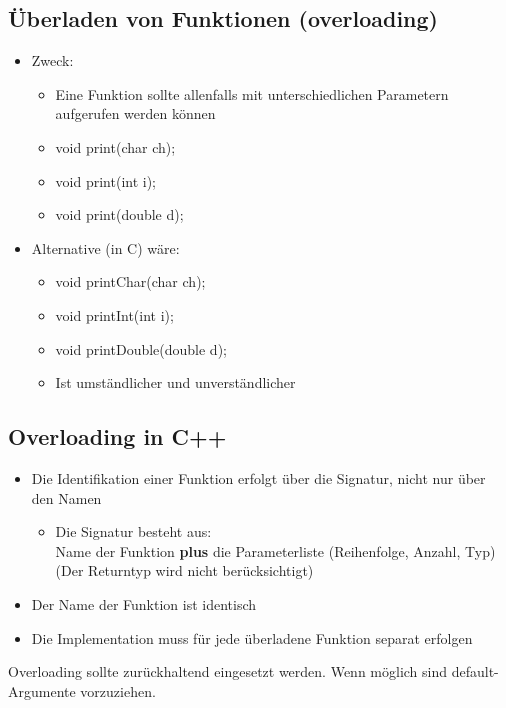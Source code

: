 \subsection{Überladen von Funktionen (overloading)}
\label{sec:Ueberladen von Funktionen (overloading)}
\begin{itemize}
	\item Zweck:
	\begin{itemize}
		\item[\-] Eine Funktion sollte allenfalls mit unterschiedlichen Parametern aufgerufen werden können\\
		\item[\-] void print(char ch);
		\item[\-] void print(int i);
		\item[\-] void print(double d);
	\end{itemize}
	\item Alternative (in C) wäre:
	\begin{itemize}
		\item[\-] void printChar(char ch);
		\item[\-] void printInt(int i);
		\item[\-] void printDouble(double d);
		\item[\-] \color{red} Ist umständlicher und unverständlicher\color{black}
 	\end{itemize}
\end{itemize}

\subsection{Overloading in C++}
\label{sec:Overloading in C++}
\begin{itemize}
	\item Die Identifikation einer Funktion erfolgt über die Signatur, nicht nur über den Namen
	\begin{itemize}
		\item Die Signatur besteht aus:
			\\ Name der Funktion \textbf{plus} die Parameterliste (Reihenfolge, Anzahl, Typ)
			\\ (Der Returntyp wird nicht berücksichtigt)
	\end{itemize}
	\item Der Name der Funktion ist identisch
	\item Die Implementation muss für jede überladene Funktion separat erfolgen
\end{itemize}
\begin{hinweis}	 %
Overloading sollte zurückhaltend eingesetzt werden. Wenn möglich sind default-Argumente vorzuziehen.
\end{hinweis}

